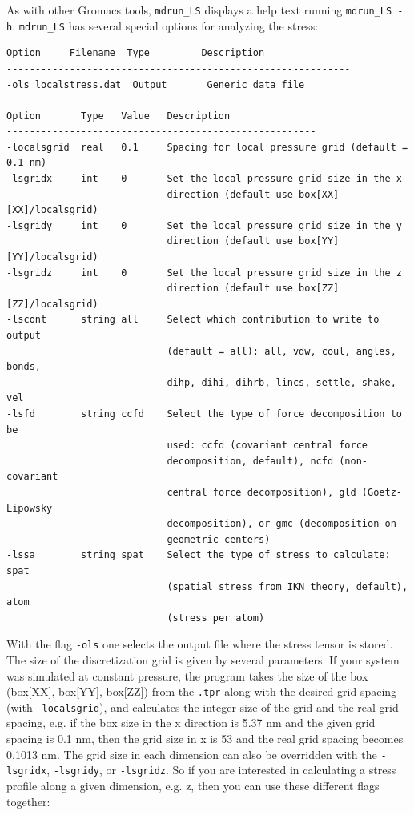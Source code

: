 \documentclass[10pt,letterpaper,notitlepage]{article}
\begin{document}
As with other Gromacs tools, \texttt{mdrun\_LS} displays a help text running \texttt{mdrun\_LS -h}. \texttt{mdrun\_LS} has several special options for analyzing the stress:
\begin{lstlisting}[caption=\texttt{mdrun\_LS} special options]
Option     Filename  Type         Description
------------------------------------------------------------
-ols localstress.dat  Output       Generic data file

Option       Type   Value   Description
------------------------------------------------------
-localsgrid  real   0.1     Spacing for local pressure grid (default = 0.1 nm)
-lsgridx     int    0       Set the local pressure grid size in the x
                            direction (default use box[XX][XX]/localsgrid)
-lsgridy     int    0       Set the local pressure grid size in the y
                            direction (default use box[YY][YY]/localsgrid)
-lsgridz     int    0       Set the local pressure grid size in the z
                            direction (default use box[ZZ][ZZ]/localsgrid)
-lscont      string all     Select which contribution to write to output
                            (default = all): all, vdw, coul, angles, bonds,
                            dihp, dihi, dihrb, lincs, settle, shake, vel
-lsfd        string ccfd    Select the type of force decomposition to be
                            used: ccfd (covariant central force
                            decomposition, default), ncfd (non-covariant
                            central force decomposition), gld (Goetz-Lipowsky
                            decomposition), or gmc (decomposition on
                            geometric centers)
-lssa        string spat    Select the type of stress to calculate: spat
                            (spatial stress from IKN theory, default), atom
                            (stress per atom)

\end{lstlisting}
With the flag \texttt{-ols} one selects the output file where the stress tensor is stored. The size of the discretization grid is given by several parameters. If your system was simulated at constant pressure, the program takes the size of the box (box[XX], box[YY], box[ZZ]) from the \texttt{.tpr} along with the desired grid spacing (with \texttt{-localsgrid}), and calculates the integer size of the grid and the real grid spacing, e.g. if the box size in the x direction is 5.37 nm and the given grid spacing is 0.1 nm, then the grid size in x is 53 and the real grid spacing becomes 0.1013 nm. The grid size in each dimension can also be overridden with the \texttt{-lsgridx}, \texttt{-lsgridy}, or \texttt{-lsgridz}. So if you are interested in calculating a stress profile along a given dimension, e.g. z, then you can use these different flags together:
\end{document}
